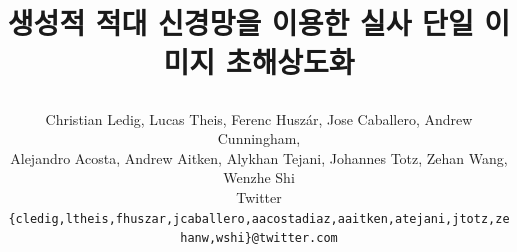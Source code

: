 \documentclass[10pt,twocolumn,letterpaper]{article}
\newcommand{\kor}[1]{#1}
\newcommand{\eng}[1]{}
\begin{document}
\title{
\eng{Photo-Realistic Single Image Super-Resolution Using a Generative Adversarial Network}
\kor{생성적 적대 신경망을 이용한 실사 단일 이미지 초해상도화}}

\onehalfspacing
\author{Christian Ledig, Lucas Theis, Ferenc Husz\'{a}r, Jose Caballero, Andrew Cunningham, \\Alejandro Acosta, Andrew Aitken, Alykhan Tejani, Johannes Totz, Zehan Wang, Wenzhe Shi\\
Twitter\\
{\tt\footnotesize \{cledig,ltheis,fhuszar,jcaballero,aacostadiaz,aaitken,atejani,jtotz,zehanw,wshi\}@twitter.com}
}

\maketitle
\end{document}
